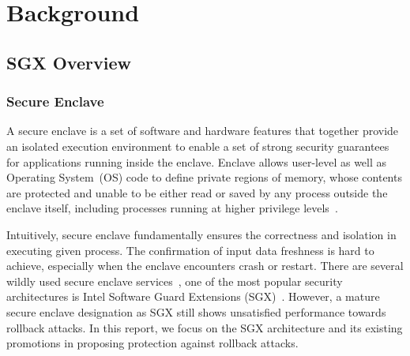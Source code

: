 \section{Background}
\subsection{SGX Overview}
\subsubsection{Secure Enclave}
A secure enclave is a set of software and hardware features that together provide an isolated execution environment to enable a set of strong security guarantees for applications running inside the enclave. Enclave allows user-level as well as Operating System~(OS) code to define private regions of memory, whose contents are protected and unable to be either read or saved by any process outside the enclave itself, including processes running at higher privilege levels~\cite{sgxsidechannel}. 



Intuitively, secure enclave fundamentally ensures the correctness and isolation in executing given process. The confirmation of input data freshness is hard to achieve, especially when the enclave encounters crash or restart. There are several wildly used secure enclave services~\cite{partition:sgx:securecomm15}, one of the most popular security architectures is Intel Software Guard Extensions (SGX)~\cite{sgxexplained}. However, a mature secure enclave designation as SGX still shows unsatisfied performance towards rollback attacks. In this report, we focus on the SGX architecture and its existing promotions in proposing protection against rollback attacks.

